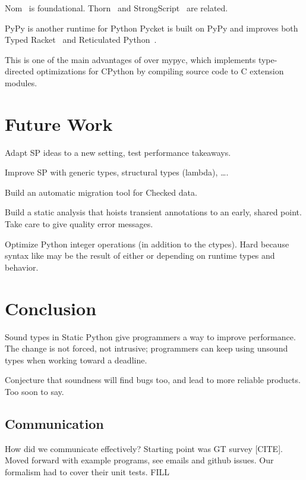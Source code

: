 \documentclass[a4paper,english,cleveref,autoref,thm-restate,anonymous,]{lipics-v2021}
\begin{document}
Nom~\cite{mt-oopsla-2017} is foundational.
Thorn~\cite{wnlov-popl-2010} and StrongScript~\cite{rzv-ecoop-2015} are related.

PyPy is another runtime for Python
Pycket is built on PyPy and improves both Typed Racket~\cite{bbst-oopsla-2017}
and Reticulated Python~\cite{vsc-dls-2019}.

This is one of the main advantages of \SP{} over mypyc,
which implements type-directed optimizations for CPython
by compiling source code to C extension modules.

\section{Future Work}
\label{s:future}

Adapt SP ideas to a new setting, test performance takeaways.

Improve SP with generic types, structural types (lambda), \ldots.

Build an automatic migration tool for Checked data.

Build a static analysis that hoists transient annotations to an early, shared point.
Take care to give quality error messages.

Optimize Python integer operations (in addition to the ctypes).
Hard because syntax like  may be the result of either 
or  depending on runtime types and behavior.


\section{Conclusion}
\label{s:conclusion}

Sound types in Static Python give programmers a way to improve performance.
The change is not forced, not intrusive;
programmers can keep using unsound types when working toward a deadline.

Conjecture that soundness will find bugs too, and lead to more reliable products.
Too soon to say.


\subsection{Communication}

How did we communicate effectively?
Starting point was GT survey [CITE].
Moved forward with example programs, see emails and github issues.
Our formalism had to cover their unit tests.
FILL




\end{document}
